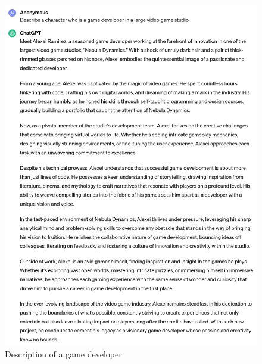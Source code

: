 \documentclass[a4paper]{article}
\begin{document}
\begin{figure}[H]
  \begin{center}
    \includegraphics[width=\textwidth]{task3/character_description_1.jpg}
    \caption{Description of a game developer}
    \label{fig:character description 1}
  \end{center}
\end{figure}
\end{document}
